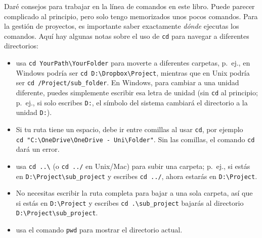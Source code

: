 \documentclass[
  letterpaper,
]{scrbook}
\providecommand{\tightlist}{%
  \setlength{\itemsep}{0pt}\setlength{\parskip}{0pt}}\usepackage{longtable,booktabs,array}
\begin{document}
\begin{tcolorbox}[enhanced jigsaw, colbacktitle=quarto-callout-note-color!10!white, arc=.35mm, opacityback=0, colframe=quarto-callout-note-color-frame, colback=white, left=2mm, leftrule=.75mm, title={Note}, bottomtitle=1mm, rightrule=.15mm, toptitle=1mm, coltitle=black, titlerule=0mm, toprule=.15mm, bottomrule=.15mm, opacitybacktitle=0.6, breakable]

Daré consejos para trabajar en la línea de comandos en este libro. Puede
parecer complicado al principio, pero solo tengo memorizados unos pocos
comandos. Para la gestión de proyectos, es importante saber exactamente
\emph{dónde} ejecutas los comandos. Aquí hay algunas notas sobre el uso
de \texttt{cd} para navegar a diferentes directorios:

\begin{itemize}
\tightlist
\item
  usa \texttt{cd\ YourPath\textbackslash{}YourFolder} para moverte a
  diferentes carpetas, p.~ej., en Windows podría ser
  \texttt{cd\ D:\textbackslash{}Dropbox\textbackslash{}Project},
  mientras que en Unix podría ser \texttt{cd\ /Project/sub\_folder}. En
  Windows, para cambiar a una unidad diferente, puedes simplemente
  escribir esa letra de unidad (sin \texttt{cd} al principio; p.~ej., si
  solo escribes \texttt{D:}, el símbolo del sistema cambiará el
  directorio a la unidad \texttt{D:}).
\item
  Si tu ruta tiene un espacio, debe ir entre comillas al usar
  \texttt{cd}, por ejemplo
  \texttt{cd\ "C:\textbackslash{}OneDrive\textbackslash{}OneDrive\ -\ Uni\textbackslash{}Folder"}.
  Sin las comillas, el comando \texttt{cd} dará un error.
\item
  usa \texttt{cd\ ..\textbackslash{}} (o \texttt{cd\ ../} en Unix/Mac)
  para subir una carpeta; p.~ej., si estás en
  \texttt{D:\textbackslash{}Project\textbackslash{}sub\_project} y
  escribes \texttt{cd\ ../}, ahora estarás en
  \texttt{D:\textbackslash{}Project}.
\item
  No necesitas escribir la ruta completa para bajar a una sola carpeta,
  así que si estás en \texttt{D:\textbackslash{}Project} y escribes
  \texttt{cd\ .\textbackslash{}sub\_project} bajarás al directorio
  \texttt{D:\textbackslash{}Project\textbackslash{}sub\_project}.
\item
  usa el comando \texttt{pwd} para mostrar el directorio actual.
\end{itemize}

\end{tcolorbox}
\end{document}
